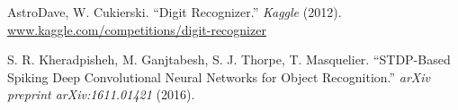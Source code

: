\begin{thebibliography}{00}
    AstroDave, W. Cukierski.
    ``Digit Recognizer.''
    \textit{Kaggle}
    (2012).
    \url{www.kaggle.com/competitions/digit-recognizer}

    S. R. Kheradpisheh, M. Ganjtabesh, S. J. Thorpe, T. Masquelier.
    ``STDP-Based Spiking Deep Convolutional Neural Networks for Object Recognition.''
    \textit{arXiv preprint arXiv:1611.01421}
    (2016).

\end{thebibliography}